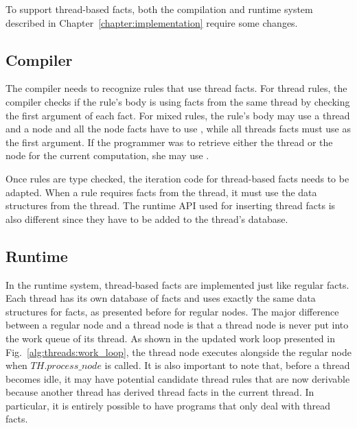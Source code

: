 To support thread-based facts, both the compilation and runtime system described in
Chapter~\ref{chapter:implementation} require some changes.

\subsection{Compiler}

The compiler needs to recognize rules that use thread facts. For thread rules,
the compiler checks if the rule's body is using facts from the same thread by
checking the first argument of each fact. For mixed rules, the rule's body may
use a thread  and a node  and all the node facts have to use
, while all threads facts must use  as the first argument. If
the programmer was to retrieve either the thread or the node for the current
computation, she may use .

Once rules are type checked, the iteration code for thread-based facts needs to
be adapted. When a rule requires facts from the thread, it must use the data
structures from the thread. The runtime API used for inserting thread facts is
also different since they have to be added to the thread's database.

\subsection{Runtime}

In the runtime system, thread-based facts are implemented just like regular
facts. Each thread has its own database of facts and uses exactly the same data
structures for facts, as presented before for regular nodes.  The major
difference between a regular node and a thread node is that a thread node is
never put into the work queue of its thread. As shown in the updated work loop
presented in Fig.~\ref{alg:threads:work_loop}, the thread node executes
alongside the regular node when $TH.process\_node$ is called. It is also
important to note that, before a thread becomes idle, it may have potential
candidate thread rules that are now derivable because another thread has derived
thread facts in the current thread. In particular, it is entirely possible to have
programs that only deal with thread facts.

